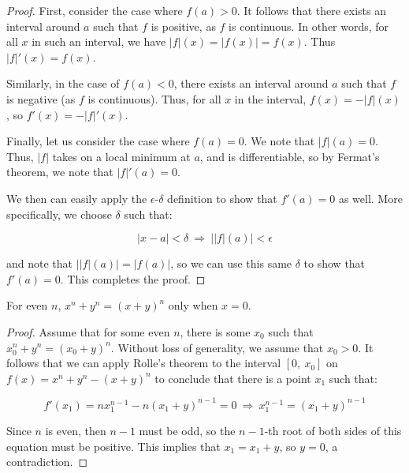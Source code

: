 \documentclass[10pt, oneside]{amsart}
\newenvironment{problem}[2][Problem]{\begin{trivlist}
\item[\hskip \labelsep {\bfseries #1}\hskip \labelsep {\bfseries #2.}]}{\end{trivlist}}
\begin{document}
    \begin{proof}
      First, consider the case where $f(a) > 0$. It follows that there exists an interval around $a$ such that $f$ is positive, as $f$ is continuous. In other words,
      for all $x$ in such an interval, we have $|f|(x) = |f(x)| = f(x)$. Thus $|f|'(x) = f(x)$.
      \newline

      Similarly, in the case of $f(a) < 0$, there exists an interval around $a$ such that $f$ is negative (as $f$ is continuous). Thus, for all
      $x$ in the interval, $f(x) = -|f|(x)$, so $f'(x) = -|f|'(x)$.
      \newline

      Finally, let us consider the case where $f(a) = 0$. We note that $|f|(a) = 0$. Thus, $|f|$ takes on a local minimum at $a$, and is differentiable, so
      by Fermat's theorem, we note that $|f|'(a) = 0$.
      \newline

      We then can easily apply the $\epsilon$-$\delta$ definition to show that $f'(a) = 0$ as well. More specifically, we choose
      $\delta$ such that:

      $$|x - a| < \delta \ \Rightarrow \ | |f|(a) | < \epsilon$$

      and note that $||f|(a)| = |f(a)|$, so we can use this same $\delta$ to show that $f'(a) = 0$. This completes the proof.
    \end{proof}

    \begin{problem}{11.57}
      For even $n$, $x^n + y^n = (x + y)^n$ only when $x = 0$.
    \end{problem}

    \begin{proof}

      Assume that for some even $n$, there is some $x_0$ such that $x_0^n + y^n = (x_0 + y)^n$. Without loss of generality, we assume that $x_0 > 0$. It follows that we can apply Rolle's theorem
      to the interval $[0, \ x_0]$ on $f(x) = x^n + y^n - (x + y)^n$ to conclude that there is a point $x_1$ such that:

      $$f'(x_1) = n x_1^{n - 1} - n(x_1 + y)^{n - 1} = 0 \ \Rightarrow \ x_1^{n - 1} = (x_1 + y)^{n - 1}$$

      Since $n$ is even, then $n - 1$ must be odd, so the $n - 1$-th root of both sides of this equation must be positive. This implies that $x_1 = x_1 + y$, so $y = 0$, a contradiction.
    \end{proof}
\end{document}
